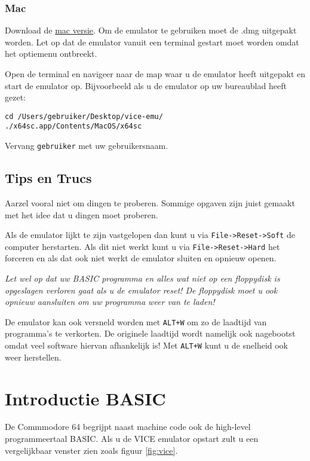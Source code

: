 \documentclass{article}
\begin{document}
\subsubsection{Mac}
Download de \href{http://sourceforge.net/projects/vice-emu/files/releases/binaries/macosx/vice-macosx-sdl-x86_64-10.12-3.1.dmg/download}{mac versie}.
Om de emulator te gebruiken moet de .dmg uitgepakt worden.
Let op dat de emulator vanuit een terminal gestart moet worden omdat het optiemenu ontbreekt.

Open de terminal en navigeer naar de map waar u de emulator heeft uitgepakt en start de emulator op. Bijvoorbeeld als u de emulator op uw bureaublad heeft gezet:
\begin{lstlisting}
cd /Users/gebruiker/Desktop/vice-emu/
./x64sc.app/Contents/MacOS/x64sc
\end{lstlisting}

Vervang \verb:gebruiker: met uw gebruikersnaam.

\subsection{Tips en Trucs}

Aarzel vooral niet om dingen te proberen.
Sommige opgaven zijn juist gemaakt met het idee dat u dingen moet proberen.

Als de emulator lijkt te zijn vastgelopen dan kunt u via \verb:File->Reset->Soft: de computer herstarten.
Als dit niet werkt kunt u via \verb:File->Reset->Hard: het forceren en als dat ook niet werkt de emulator sluiten en opnieuw openen.

\emph{Let wel op dat uw BASIC programma en alles wat niet op een floppydisk is opgeslagen verloren gaat als u de emulator reset!
De floppydisk moet u ook opnieuw aansluiten om uw programma weer van te laden!}

De emulator kan ook versneld worden met \verb:ALT+W: om zo de laadtijd van programma's te verkorten.
De originele laadtijd wordt namelijk ook nagebootst omdat veel software hiervan afhankelijk is!
Met \verb:ALT+W: kunt u de snelheid ook weer herstellen.



\section{Introductie BASIC}

De Commmodore 64 begrijpt naast machine code ook de high-level programmeertaal BASIC.
Als u de VICE emulator opstart zult u een vergelijkbaar venster zien zoals figuur \ref{fig:vice}.
\end{document}
